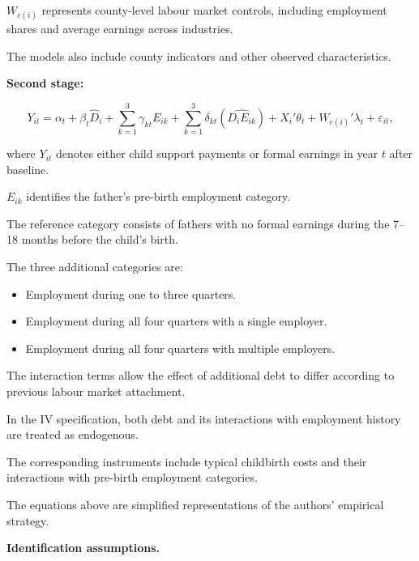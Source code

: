 \documentclass{article}
\begin{document}
$W_{c(i)}$ represents county-level
labour market controls, including
employment shares and average earnings
across industries.

The models also include county indicators
and other observed characteristics.

\medskip

\noindent
\textbf{Second stage:}

\begin{equation}
Y_{it}
=
\alpha_t
+
\beta_t \widehat{D}_i
+
\sum_{k=1}^{3}
\gamma_{kt} E_{ik}
+
\sum_{k=1}^{3}
\delta_{kt}
\left(
\widehat{D_i E_{ik}}
\right)
+
X_i'\theta_t
+
W_{c(i)}'\lambda_t
+
\varepsilon_{it},
\end{equation}

where $Y_{it}$ denotes either child
support payments or formal earnings
in year $t$ after baseline.

$E_{ik}$ identifies the father's
pre-birth employment category.

The reference category consists of
fathers with no formal earnings
during the 7--18 months before
the child's birth.

The three additional categories are:

\begin{itemize}

    \item Employment during one to
    three quarters.

    \item Employment during all four
    quarters with a single employer.

    \item Employment during all four
    quarters with multiple employers.

\end{itemize}

The interaction terms allow the effect
of additional debt to differ according
to previous labour market attachment.

In the IV specification, both debt
and its interactions with employment
history are treated as endogenous.

The corresponding instruments include
typical childbirth costs and their
interactions with pre-birth employment
categories.

The equations above are simplified
representations of the authors'
empirical strategy.

\medskip

\noindent
\textbf{Identification assumptions.}
\end{document}
